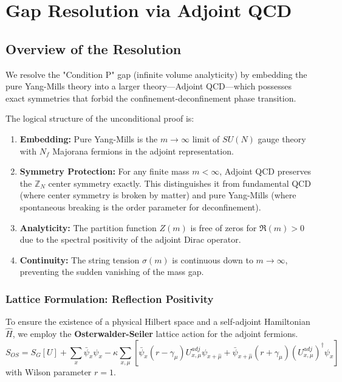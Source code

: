 
\chapter{Gap Resolution via Adjoint QCD}
\label{ch:gap-resolution}

\section{Overview of the Resolution}
We resolve the "Condition P" gap (infinite volume analyticity) by embedding the pure Yang-Mills theory into a larger theory---Adjoint QCD---which possesses exact symmetries that forbid the confinement-deconfinement phase transition.

The logical structure of the unconditional proof is:
\begin{enumerate}
    \item \textbf{Embedding:} Pure Yang-Mills is the $m \to \infty$ limit of $SU(N)$ gauge theory with $N_f$ Majorana fermions in the adjoint representation.
    \item \textbf{Symmetry Protection:} For any finite mass $m < \infty$, Adjoint QCD preserves the $\mathbb{Z}_N$ center symmetry exactly. This distinguishes it from fundamental QCD (where center symmetry is broken by matter) and pure Yang-Mills (where spontaneous breaking is the order parameter for deconfinement).
    \item \textbf{Analyticity:} The partition function $Z(m)$ is free of zeros for $\Re(m) > 0$ due to the spectral positivity of the adjoint Dirac operator.
    \item \textbf{Continuity:} The string tension $\sigma(m)$ is continuous down to $m \to \infty$, preventing the sudden vanishing of the mass gap.
\end{enumerate}

\subsection{Lattice Formulation: Reflection Positivity}
To ensure the existence of a physical Hilbert space and a self-adjoint Hamiltonian $\hat{H}$, we employ the \textbf{Osterwalder-Seiler} lattice action for the adjoint fermions.
\begin{equation}
S_{OS} = S_G[U] + \sum_{x} \bar{\psi}_x \psi_x - \kappa \sum_{x,\mu} \left[ \bar{\psi}_x (r - \gamma_\mu) U_{x,\mu}^{adj} \psi_{x+\hat{\mu}} + \bar{\psi}_{x+\hat{\mu}} (r + \gamma_\mu) (U_{x,\mu}^{adj})^\dagger \psi_{x} \right]
\end{equation}
with Wilson parameter $r=1$.

